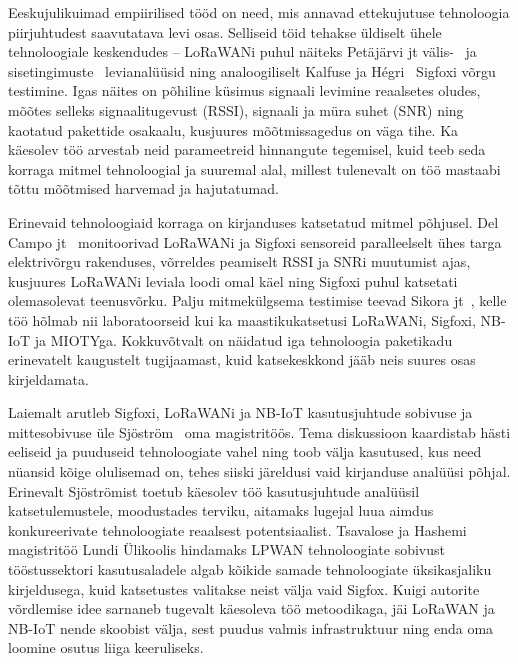 \documentclass[12pt]{article}
\begin{document}
    Eeskujulikuimad empiirilised tööd on need, mis annavad ettekujutuse tehnoloogia piirjuhtudest saavutatava levi osas.
    Selliseid töid tehakse üldiselt ühele tehnoloogiale keskendudes -- LoRaWANi puhul näiteks Petäjärvi jt välis-~\cite{petajajarvi2015coverage} ja sisetingimuste~\cite{petajajarvi} levianalüüsid ning analoogiliselt Kalfuse ja Hégri~\cite{kalfus2016ultra} Sigfoxi võrgu testimine.
    Igas näites on põhiline küsimus signaali levimine reaalsetes oludes, mõõtes selleks signaalitugevust (RSSI), signaali ja müra suhet (SNR) ning kaotatud pakettide osakaalu, kusjuures mõõtmissagedus on väga tihe.
    Ka käesolev töö arvestab neid parameetreid hinnangute tegemisel, kuid teeb seda korraga mitmel tehnoloogial ja suuremal alal, millest tulenevalt on töö mastaabi tõttu mõõtmised harvemad ja hajutatumad.

    Erinevaid tehnoloogiaid korraga on kirjanduses katsetatud mitmel põhjusel.
    Del Campo jt~\cite{del2019hybrid} monitoorivad LoRaWANi ja Sigfoxi sensoreid paralleelselt ühes targa elektrivõrgu rakenduses, võrreldes peamiselt RSSI ja SNRi muutumist ajas, kusjuures LoRaWANi leviala loodi omal käel ning Sigfoxi puhul katsetati olemasolevat teenusvõrku.
    Palju mitmekülgsema testimise teevad Sikora jt~\cite{sikora2019test}, kelle töö hõlmab nii laboratoorseid kui ka maastikukatsetusi LoRaWANi, Sigfoxi, NB-IoT ja MIOTYga.
    Kokkuvõtvalt on näidatud iga tehnoloogia paketikadu erinevatelt kaugustelt tugijaamast, kuid katsekeskkond jääb neis suures osas kirjeldamata.

    Laiemalt arutleb Sigfoxi, LoRaWANi ja NB-IoT kasutusjuhtude sobivuse ja mittesobivuse üle Sjöström~\cite{sjostrom2017unlicensed} oma magistritöös.
    Tema diskussioon kaardistab hästi eeliseid ja puuduseid tehnoloogiate vahel ning toob välja kasutused, kus need nüansid kõige olulisemad on, tehes siiski järeldusi vaid kirjanduse analüüsi põhjal.
    Erinevalt Sjöströmist toetub käesolev töö kasutusjuhtude analüüsil katsetulemustele, moodustades terviku, aitamaks lugejal luua aimdus konkureerivate tehnoloogiate reaalsest potentsiaalist.
    Tsavalose ja Hashemi~\cite{tsavalos2018low} magistritöö Lundi Ülikoolis hindamaks LPWAN tehnoloogiate sobivust tööstussektori kasutusaladele algab kõikide samade tehnoloogiate üksikasjaliku kirjeldusega, kuid katsetustes valitakse neist välja vaid Sigfox.
    Kuigi autorite võrdlemise idee sarnaneb tugevalt käesoleva töö metoodikaga, jäi LoRaWAN ja NB-IoT nende skoobist välja, sest puudus valmis infrastruktuur ning enda oma loomine osutus liiga keeruliseks.
\end{document}
